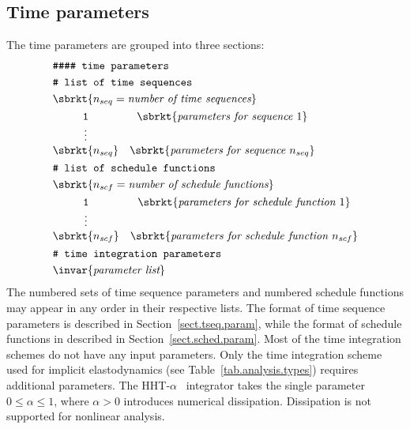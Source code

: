 \subsection{Time parameters}
\label{sect.time.parameters}
The time parameters are grouped into three sections:
\begin{align}
& \texttt{\#\#\#\# time parameters} \notag \\
& \texttt{\# list of time sequences} \notag \\
& \sbrkt{n_{seq} = \textit{number of time sequences}} \notag \\
& \begin{matrix}
\texttt{1} & \sbrkt{\textit{parameters for sequence~} 1} \\
\vdots \\
\sbrkt{n_{seq}}  & \sbrkt{\textit{parameters for sequence~} n_{seq}}
\end{matrix} \notag \\
& \texttt{\# list of schedule functions} \notag \\
& \sbrkt{n_{scf} = \textit{number of schedule functions}} \notag \\
& \begin{matrix}
\texttt{1} & \sbrkt{\textit{parameters for schedule function~} 1} \\
\vdots \\
\sbrkt{n_{scf}}  & \sbrkt{\textit{parameters for schedule function~} n_{scf}}
\end{matrix} \notag \\
& \texttt{\# time integration parameters} \notag \\
& \invar{\textit{parameter list}} \notag
\end{align}
The numbered sets of time sequence parameters and numbered schedule 
functions may appear in any order in their respective lists. The 
format of time sequence parameters is described in 
Section~\ref{sect.tseq.param}, while the format of schedule functions 
in described in Section~\ref{sect.sched.param}. Most of the time 
integration schemes do not have any input parameters. Only the time 
integration scheme used for implicit elastodynamics 
(see Table~\ref{tab.analysis.types}) requires additional parameters.
The HHT-$\alpha$~\cite{Hughes1977} integrator takes the single 
parameter $0 \leq \alpha \leq 1$, where $\alpha > 0$ introduces 
numerical dissipation. Dissipation is not supported for nonlinear 
analysis.

